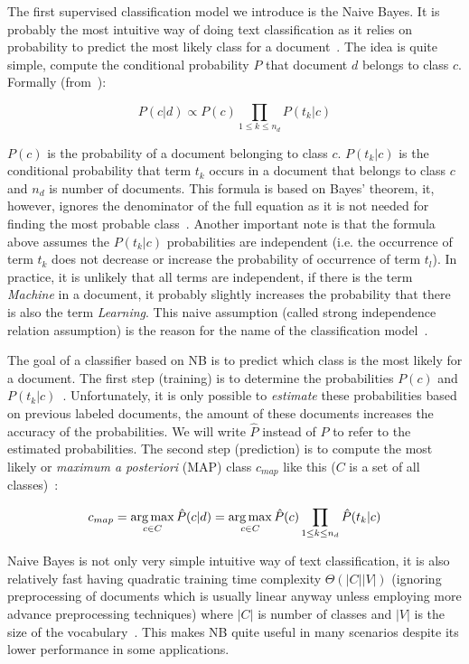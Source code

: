 The first supervised classification model we introduce is the Naive Bayes. It is probably the most intuitive way of doing text classification as it relies on probability to predict the most likely class for a document~\cite{manning2008introduction}. The idea is quite simple, compute the conditional probability $P$ that document $d$ belongs to class $c$. Formally (from~\cite{manning2008introduction}):

$$P(c|d) \propto P(c) \prod_{1 \leq k \leq n_d} P(t_k|c)$$ 

$P(c)$ is the probability of a document belonging to class $c$. $P(t_k|c)$ is the conditional probability that term $t_k$ occurs in a document that belongs to class $c$ and $n_d$ is number of documents. This formula is based on Bayes' theorem, it, however, ignores the denominator of the full equation as it is not needed for finding the most probable class~\cite{hand2001bayes}. Another important note is that the formula above assumes the $P(t_k|c)$ probabilities are independent (i.e. the occurrence of term $t_k$ does not decrease or increase the probability of occurrence of term $t_l$). In practice, it is unlikely that all terms are independent, if there is the term \textit{Machine} in a document, it probably slightly increases the probability that there is also the term \textit{Learning}. This naive assumption (called strong independence relation assumption) is the reason for the name of the classification model~\cite{hand2001bayes}.

The goal of a classifier based on NB is to predict which class is the most likely for a document. The first step (training) is to determine the probabilities $P(c)$ and $P(t_k|c)$~\cite{manning2008introduction}. Unfortunately, it is only possible to \textit{estimate} these probabilities based on previous labeled documents, the amount of these documents increases the accuracy of the probabilities. We will write $\hat{P}$ instead of $P$ to refer to the estimated probabilities. The second step (prediction) is to compute the most likely or \textit{maximum a posteriori} (MAP) class $c_{map}$ like this ($C$ is a set of all classes)~\cite{manning2008introduction}:

$$c_{map} = \operatorname*{arg\,max}_{c \in C} \hat{P}(c|d) = \operatorname*{arg\,max}_{c \in C} \hat{P}(c) \prod_{1 \leq k \leq n_d} \hat{P}(t_k|c)$$

Naive Bayes is not only very simple intuitive way of text classification, it is also relatively fast having quadratic training time complexity $\Theta(|C||V|)$ (ignoring preprocessing of documents which is usually linear anyway unless employing more advance preprocessing techniques) where $|C|$ is number of classes and $|V|$ is the size of the vocabulary~\cite{manning2008introduction}. This makes NB quite useful in many scenarios despite its lower performance in some applications.

